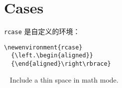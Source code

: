 
\section{Cases}


\texttt{rcase} 是自定义的环境：

\begin{verbatim}
\newenvironment{rcase}
  {\left.\begin{aligned}}
  {\end{aligned}\right\rbrace}
\end{verbatim}


\begin{remark*}
\texttt{\,} Include a thin space in math mode.
\end{remark*}
